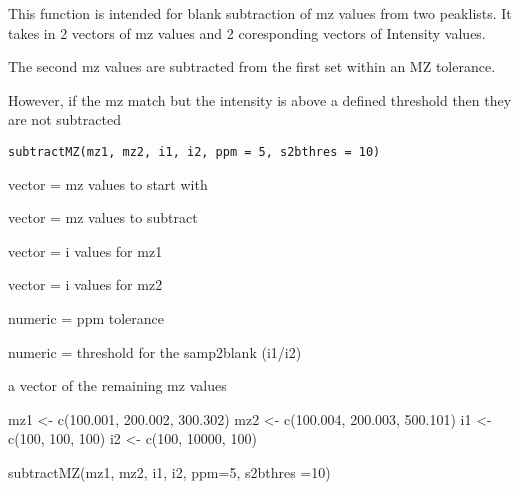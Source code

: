 \documentclass[letterpaper]{book}
\begin{document}
%
\begin{Description}\relax
This function is intended for blank subtraction of mz values from two peaklists. It takes in 2 vectors of mz values and 2
coresponding vectors of Intensity values.

The second mz values are subtracted from the first set within an MZ tolerance.

However, if the mz match but the intensity is above a defined threshold then they are not subtracted
\end{Description}
%
\begin{Usage}
\begin{verbatim}
subtractMZ(mz1, mz2, i1, i2, ppm = 5, s2bthres = 10)
\end{verbatim}
\end{Usage}
%
\begin{Arguments}
\begin{ldescription}
\item[\code{mz1}] vector = mz values to start with

\item[\code{mz2}] vector = mz values to subtract

\item[\code{i1}] vector = i values for mz1

\item[\code{i2}] vector = i values for mz2

\item[\code{ppm}] numeric = ppm tolerance

\item[\code{s2bthres}] numeric = threshold for the samp2blank (i1/i2)
\end{ldescription}
\end{Arguments}
%
\begin{Value}
a vector of the remaining mz values
\end{Value}
%
\begin{Examples}
\begin{ExampleCode}
mz1 <- c(100.001, 200.002, 300.302)
mz2 <- c(100.004, 200.003, 500.101)
i1 <- c(100, 100, 100)
i2 <- c(100, 10000, 100)

subtractMZ(mz1, mz2, i1, i2, ppm=5, s2bthres =10)
\end{ExampleCode}
\end{Examples}
\end{document}
